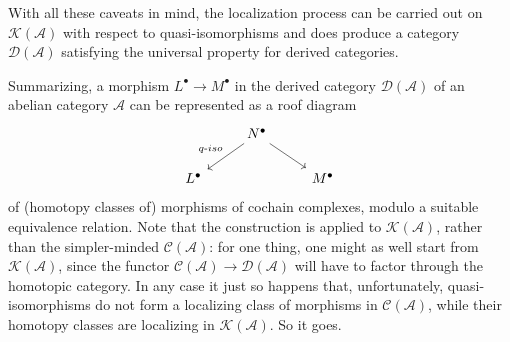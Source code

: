 With all these caveats in mind, the localization process can be carried out on $\mathcal{K}(\mathcal{A})$ with respect to quasi-isomorphisms and does produce a category $\mathcal{D}(\mathcal{A})$ satisfying the universal property for derived categories.\par
Summarizing, a morphism $L^\bullet\to M^\bullet$ in the derived category $\mathcal{D}(\mathcal{A})$ of an abelian category $\mathcal{A}$ can be represented as a roof diagram
\[\begin{tikzcd}
&N^\bullet\ar[ld,swap,"q\text{-}iso"]\ar[rd]&\\
L^\bullet&&M^\bullet
\end{tikzcd}\]
of (homotopy classes of) morphisms of cochain complexes, modulo a suitable equivalence relation. Note that the construction is applied to $\mathcal{K}(\mathcal{A})$, rather than the
simpler-minded $\mathcal{C}(\mathcal{A})$: for one thing, one might as well start from $\mathcal{K}(\mathcal{A})$, since the functor $\mathcal{C}(\mathcal{A})\to\mathcal{D}(\mathcal{A})$ will have to factor through the homotopic category. In any case it just so happens that, unfortunately, quasi-isomorphisms do not form a localizing class of morphisms in $\mathcal{C}(\mathcal{A})$, while their homotopy classes
are localizing in $\mathcal{K}(\mathcal{A})$. So it goes.
